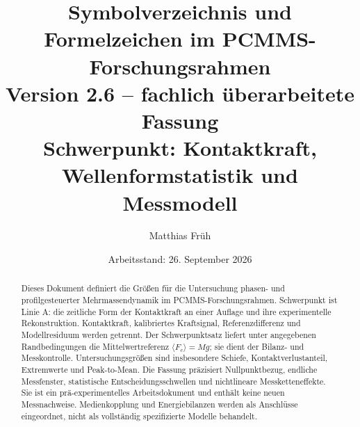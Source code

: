 \documentclass[11pt,a4paper]{article}
\begin{document}
\title{Symbolverzeichnis und Formelzeichen im PCMMS-Forschungsrahmen\\[.5em]\large Version 2.6 -- fachlich überarbeitete Fassung\\Schwerpunkt: Kontaktkraft, Wellenformstatistik und Messmodell}
\author{Matthias Früh}
\date{Arbeitsstand: 26. September 2026}
\maketitle
\begin{abstract}
Dieses Dokument definiert die Größen für die Untersuchung phasen- und profilgesteuerter Mehrmassendynamik im PCMMS-Forschungsrahmen. Schwerpunkt ist Linie A: die zeitliche Form der Kontaktkraft an einer Auflage und ihre experimentelle Rekonstruktion. Kontaktkraft, kalibriertes Kraftsignal, Referenzdifferenz und Modellresiduum werden getrennt. Der Schwerpunktsatz liefert unter angegebenen Randbedingungen die Mittelwertreferenz $\langle F_c\rangle=Mg$; sie dient der Bilanz- und Messkontrolle. Untersuchungsgrößen sind insbesondere Schiefe, Kontaktverlustanteil, Extremwerte und Peak-to-Mean. Die Fassung präzisiert Nullpunktbezug, endliche Messfenster, statistische Entscheidungsschwellen und nichtlineare Messketteneffekte. Sie ist ein prä-experimentelles Arbeitsdokument und enthält keine neuen Messnachweise. Medienkopplung und Energiebilanzen werden als Anschlüsse eingeordnet, nicht als vollständig spezifizierte Modelle behandelt.
\end{abstract}
\clearpage
\tableofcontents
\clearpage
\end{document}

